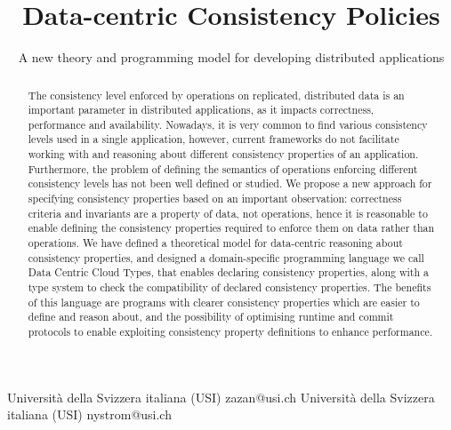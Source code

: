 \documentclass[preprint, numbers]{sigplanconf}
\begin{document}
\setlength{\pdfpageheight}{\paperheight}
\setlength{\pdfpagewidth}{\paperwidth}




\title{Data-centric Consistency Policies}
\subtitle{A new theory and programming model for developing
  distributed applications}

           {Università della Svizzera italiana (USI)}
           {zazan@usi.ch}
           {Università della Svizzera italiana (USI)}
           {nystrom@usi.ch}

\maketitle

\begin{abstract}
The consistency level enforced by operations on replicated, distributed data is 
an important parameter in distributed applications, as it impacts correctness, 
performance and availability. Nowadays, it is very common to find various consistency
levels used in a single application, however, current frameworks do not facilitate
working with and reasoning about different consistency properties of an application. 
Furthermore, the problem of defining the semantics of operations enforcing different 
consistency levels has not been well defined or studied. We propose a new
approach for specifying consistency properties based on an important observation: 
correctness criteria and invariants are a property of data, not operations, hence it is 
reasonable to enable defining the consistency properties required to enforce them on data 
rather than operations. We have defined a theoretical model for data-centric reasoning about consistency
properties, and designed a domain-specific programming language we call Data Centric Cloud Types, that enables 
declaring consistency properties, along with a type system to check the compatibility of declared consistency 
properties. The benefits of this language are programs with clearer consistency properties which are 
easier to define and reason about, and the possibility of optimising runtime and commit protocols to enable 
exploiting consistency property definitions to enhance performance.
\end{abstract}
\end{document}
